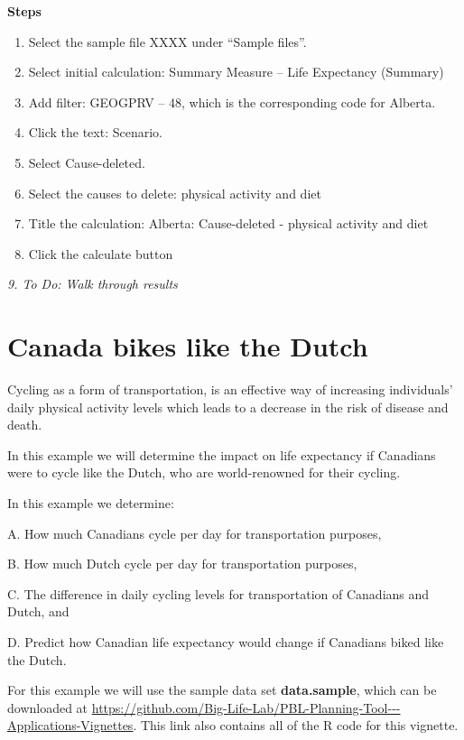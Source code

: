 \documentclass[]{book}
\begin{document}
\textbf{Steps}

\begin{enumerate}
\def\labelenumi{\arabic{enumi}.}
\item
  Select the sample file XXXX under ``Sample files''.
\item
  Select initial calculation: Summary Measure -- Life Expectancy
  (Summary)
\item
  Add filter: GEOGPRV -- 48, which is the corresponding code for
  Alberta.
\item
  Click the text: Scenario.
\item
  Select Cause-deleted.
\item
  Select the causes to delete: physical activity and diet
\item
  Title the calculation: Alberta: Cause-deleted - physical activity and
  diet
\item
  Click the calculate button
\end{enumerate}

\emph{9. To Do: Walk through results}

\section{Canada bikes like the Dutch}\label{canada-bikes-like-the-dutch}

Cycling as a form of transportation, is an effective way of increasing
individuals' daily physical activity levels which leads to a decrease in
the risk of disease and death.

In this example we will determine the impact on life expectancy if
Canadians were to cycle like the Dutch, who are world-renowned for their
cycling.

In this example we determine:

A. How much Canadians cycle per day for transportation purposes,

B. How much Dutch cycle per day for transportation purposes,

C. The difference in daily cycling levels for transportation of
Canadians and Dutch, and

D. Predict how Canadian life expectancy would change if Canadians biked
like the Dutch.

For this example we will use the sample data set \textbf{data.sample},
which can be downloaded at
\url{https://github.com/Big-Life-Lab/PBL-Planning-Tool---Applications-Vignettes}.
This link also contains all of the R code for this vignette.
\end{document}
